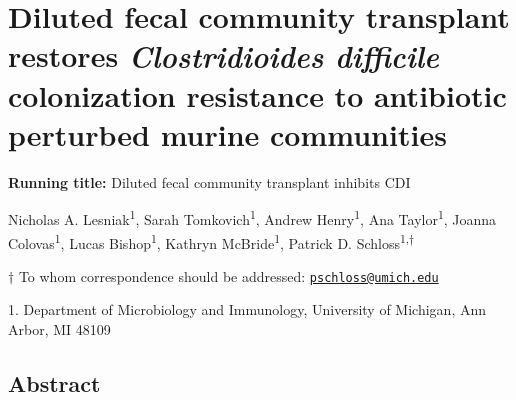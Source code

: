 \documentclass[
  12pt,
]{article}
\author{}
\date{\vspace{-2.5em}}
\begin{document}
\linenumbers
\doublespacing

\hypertarget{diluted-fecal-community-transplant-restores-clostridioides-difficile-colonization-resistance-to-antibiotic-perturbed-murine-communities}{%
\section{\texorpdfstring{Diluted fecal community transplant restores
\emph{Clostridioides difficile} colonization resistance to antibiotic
perturbed murine
communities}{Diluted fecal community transplant restores Clostridioides difficile colonization resistance to antibiotic perturbed murine communities}}\label{diluted-fecal-community-transplant-restores-clostridioides-difficile-colonization-resistance-to-antibiotic-perturbed-murine-communities}}

\vspace{30mm}

\textbf{Running title:} Diluted fecal community transplant inhibits CDI

\vspace{20mm}

Nicholas A. Lesniak\textsuperscript{1}, Sarah
Tomkovich\textsuperscript{1}, Andrew Henry\textsuperscript{1}, Ana
Taylor\textsuperscript{1}, Joanna Colovas\textsuperscript{1}, Lucas
Bishop\textsuperscript{1}, Kathryn McBride\textsuperscript{1}, Patrick
D. Schloss\textsuperscript{1,\(\dagger\)}

\vspace{40mm}

\(\dagger\) To whom correspondence should be addressed:
\href{mailto:pschloss@umich.edu}{\nolinkurl{pschloss@umich.edu}}

1. Department of Microbiology and Immunology, University of Michigan,
Ann Arbor, MI 48109

\newpage

\hypertarget{abstract}{%
\subsection{Abstract}\label{abstract}}
\end{document}
